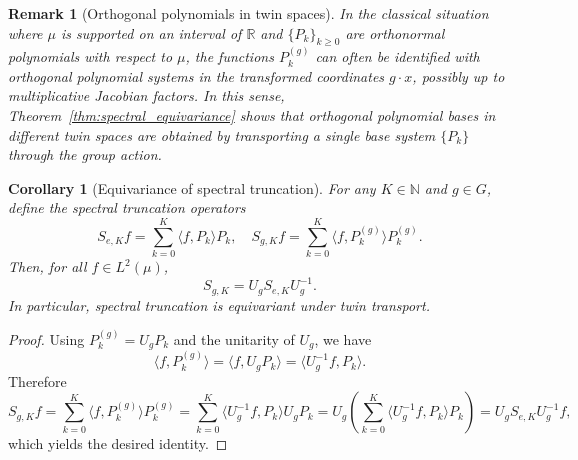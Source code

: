\documentclass[11pt,a4paper]{article}
\newtheorem{corollary}[theorem]{Corollary}
\newtheorem{remark}[theorem]{Remark}
\newcommand{\R}{\mathbb{R}}
\newcommand{\N}{\mathbb{N}}
\newcommand{\ip}[2]{\langle #1, #2 \rangle}
\begin{document}
\begin{remark}[Orthogonal polynomials in twin spaces]\label{rem:ortho_poly_twin}
In the classical situation where $\mu$ is supported on an interval of $\R$ and $\{P_k\}_{k \geq 0}$ are orthonormal polynomials with respect to $\mu$, the functions $P_k^{(g)}$ can often be identified with orthogonal polynomial systems in the transformed coordinates $g \cdot x$, possibly up to multiplicative Jacobian factors. In this sense, Theorem~\ref{thm:spectral_equivariance} shows that orthogonal polynomial bases in different twin spaces are obtained by transporting a single base system $\{P_k\}$ through the group action.
\end{remark}

\begin{corollary}[Equivariance of spectral truncation]\label{cor:equivariance_truncation}
For any $K \in \N$ and $g \in G$, define the spectral truncation operators
\[
S_{e,K} f = \sum_{k=0}^{K} \ip{f}{P_k} P_k, \quad S_{g,K} f = \sum_{k=0}^{K} \ip{f}{P_k^{(g)}} P_k^{(g)}.
\]
Then, for all $f \in L^2(\mu)$,
\[
S_{g,K} = U_g S_{e,K} U_g^{-1}.
\]
In particular, spectral truncation is equivariant under twin transport.
\end{corollary}

\begin{proof}
Using $P_k^{(g)} = U_g P_k$ and the unitarity of $U_g$, we have
\[
\ip{f}{P_k^{(g)}} = \ip{f}{U_g P_k} = \ip{U_g^{-1} f}{P_k}.
\]
Therefore
\[
S_{g,K} f = \sum_{k=0}^{K} \ip{f}{P_k^{(g)}} P_k^{(g)} = \sum_{k=0}^{K} \ip{U_g^{-1} f}{P_k} U_g P_k = U_g \left( \sum_{k=0}^{K} \ip{U_g^{-1} f}{P_k} P_k \right) = U_g S_{e,K} U_g^{-1} f,
\]
which yields the desired identity.
\end{proof}
\end{document}
